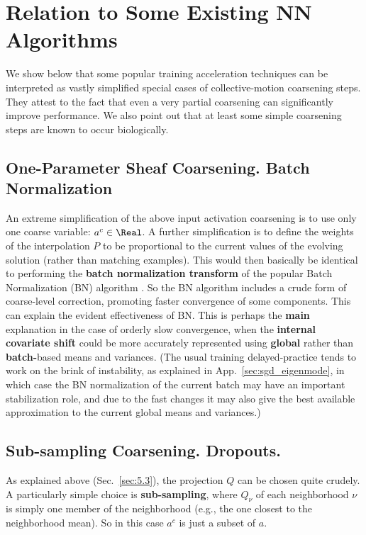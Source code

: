 \documentclass{article} %
\begin{document}
\section{Relation to Some Existing NN Algorithms}
\label{sec:relation_existing}
We show below that some popular training acceleration techniques can be interpreted as vastly simplified special cases of collective-motion coarsening steps. They attest to the fact that even a very partial coarsening can significantly improve performance. We also point out that at least some simple coarsening steps are known to occur biologically.

\subsection{One-Parameter Sheaf Coarsening. Batch Normalization}
An extreme simplification of the above input activation coarsening is to use only one coarse variable: $a^c \in \Real$. A further simplification is to define the weights of the interpolation $P$ to be proportional to the current values of the evolving solution (rather than matching examples). This would then basically be identical to performing the \textbf{batch normalization transform} of the popular Batch Normalization (BN) algorithm \cite{bn}. So the BN algorithm includes a crude form of coarse-level correction, promoting faster convergence of some components. This can explain the evident effectiveness of BN. This is perhaps the \textbf{main} explanation in the case of orderly slow convergence, when the \textbf{internal covariate shift} could be more accurately represented using \textbf{global} rather than \textbf{batch-}based means and variances. (The usual training delayed-practice tends to work on the brink of instability, as explained in App.~\ref{sec:sgd_eigenmode}, in which case the BN normalization of the current batch may have an important stabilization role, and due to the fast changes it may also give the best available approximation to the current global means and variances.)

\subsection{Sub-sampling Coarsening. Dropouts.}
As explained above (Sec.~\ref{sec:5.3}), the projection $Q$ can be chosen quite crudely. A particularly simple choice is \textbf{sub-sampling}, where $Q_{\nu}$ of each neighborhood $\nu$ is simply one member of the neighborhood (e.g., the one closest to the neighborhood mean). So in this case $a^c$ is just a subset of $a$.
\end{document}
